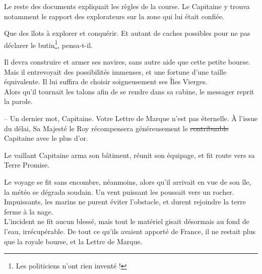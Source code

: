 \newpage

Le reste des documents expliquait les règles de la course. Le
Capitaine y trouva notamment le rapport des explorateurs sur la zone
qui lui était confiée.

Que des îlots à explorer et conquérir. Et autant de caches possibles
pour ne pas déclarer le butin\footnote{Les politiciens n'ont rien
inventé !}, pensa-t-il.

Il devra construire et armer ses navires, sans autre aide que cette
petite bourse. Mais il entrevoyait des possibilités immenses, et une
fortune d'une taille équivalente. Il lui suffira de choisir
soigneusement ses Îles Vierges.\\

Alors qu'il tournait les talons afin de se rendre dans sa cabine, le
messager reprit la parole.

-- Un dernier mot, Capitaine. Votre Lettre de Marque n'est pas
   éternelle. À l'issue du délai, Sa Majesté le Roy récompensera
   généreusement le \st{contribuable} Capitaine avec le plus d'or.

\culdelampe{}

Le vaillant Capitaine arma son bâtiment, réunit son équipage, et fit
route vers sa Terre Promise.

Le voyage se fit sans encombre, néanmoins, alors qu'il arrivait en vue
de son île, la météo se dégrada soudain. Un vent puissant les poussait
vers un rocher. Impuissants, les marins ne purent éviter l'obstacle,
et durent rejoindre la terre ferme à la nage.\\

L'incident ne fit aucun blessé, mais tout le matériel gisait désormais
au fond de l'eau, irrécupérable. De tout ce qu'ils avaient apporté de
France, il ne restait plus que la royale bourse, et la Lettre de
Marque.\\


